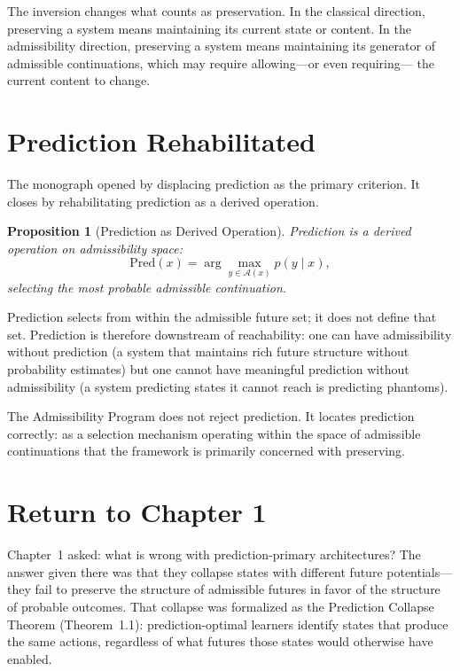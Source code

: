 \documentclass[12pt, oneside]{book}
\theoremstyle{flyxion}
\newtheorem{proposition}[theorem]{Proposition}
\theoremstyle{definition}
\begin{document}
The inversion changes what counts as preservation.
In the classical direction, preserving a system means
maintaining its current state or content. In the
admissibility direction, preserving a system means
maintaining its generator of admissible continuations,
which may require allowing---or even requiring---
the current content to change.

\section{Prediction Rehabilitated}

The monograph opened by displacing prediction as the
primary criterion. It closes by rehabilitating
prediction as a derived operation.

\begin{proposition}[Prediction as Derived Operation]
Prediction is a derived operation on admissibility
space:
\[
\mathrm{Pred}(x) = \arg\max_{y \in \mathcal{A}(x)}
p(y \mid x),
\]
selecting the most probable admissible continuation.
\end{proposition}

Prediction selects from within the admissible future
set; it does not define that set. Prediction is
therefore downstream of reachability: one can have
admissibility without prediction (a system that
maintains rich future structure without probability
estimates) but one cannot have meaningful prediction
without admissibility (a system predicting states it
cannot reach is predicting phantoms).

The Admissibility Program does not reject prediction.
It locates prediction correctly: as a selection
mechanism operating within the space of admissible
continuations that the framework is primarily concerned
with preserving.

\section{Return to Chapter 1}

Chapter~1 asked: what is wrong with prediction-primary
architectures? The answer given there was that they
collapse states with different future potentials---they
fail to preserve the structure of admissible futures
in favor of the structure of probable outcomes. That
collapse was formalized as the Prediction Collapse
Theorem (Theorem~1.1): prediction-optimal learners
identify states that produce the same actions,
regardless of what futures those states would otherwise
have enabled.
\end{document}
